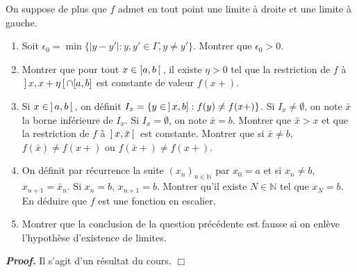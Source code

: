 \documentclass[11pt,a4paper]{article}
\newcommand{\NN}{\mathbb{N}}
\newenvironment{preuve}[1][]
{\vskip 2mm  \noindent\emph{\bf Proof#1. }}{$\Box$ \vskip 2mm}
\begin{document}
On suppose de plus que $f$ admet en tout point une limite à droite et une limite à gauche.
\begin{enumerate}
	\item Soit $\epsilon_0=\min\{|y-y'| :  y,y'\in\Gamma, y \neq y' \}$. 
	Montrer que $\epsilon_0>0$.
	
	
	\item Montrer que pour tout $x\in [a,b \hskip 0.6mm [\hskip 0.6mm$, il existe $\eta>0$ tel que la restriction de $f$ à $\hskip 0.6mm ] \hskip 0.6mmx ,x+\eta \hskip 0.6mm [ \hskip 0.6mm \cap [a,b]$ est constante de valeur $f(x+)$.
	
	\item Si $x\in \hskip 0.6mm]\hskip 0.6mm a,b\hskip 0.6mm [ \hskip 0.6mm$, on définit $I_x=\{y\in \hskip 0.6mm ] \hskip 0.6mm x,b] : f(y) \neq f(x+) \}$. 
	Si $I_x \neq \emptyset$, on note $\bar{x}$ la borne inférieure de $I_x$. 
	Si $I_x=\emptyset$, on note $\bar{x}=b$. 
	Montrer que $\bar{x}>x$ et que la restriction de $f$ à $\hskip 0.6mm ] \hskip 0.6mm x,\bar{x} \hskip 0.6mm [ \hskip 0.6mm$ est constante. 
	Montrer que si $\bar{x} \neq b$, $f(\bar{x}) \neq f(x+)$ ou $f(\bar{x}+) \neq f(x+)$.
	
	\item On définit par récurrence la suite $(x_n)_{n\in \NN}$ par $x_0=a$ et si $x_n \neq b$, $x_{n+1}=\bar{x}_n$. 
	Si $x_n=b$,  $x_{n+1}=b$. 
	Montrer qu'il existe $N\in\NN$ tel que $x_N=b$. 
	En déduire que $f$ est une fonction en escalier.
	
	\item Montrer que la conclusion de la question précédente est fausse si on enlève l'hypothèse d'existence de limites.
\end{enumerate}

\begin{preuve}
	Il s'agit d'un résultat du cours. 
\end{preuve}
\end{document}
